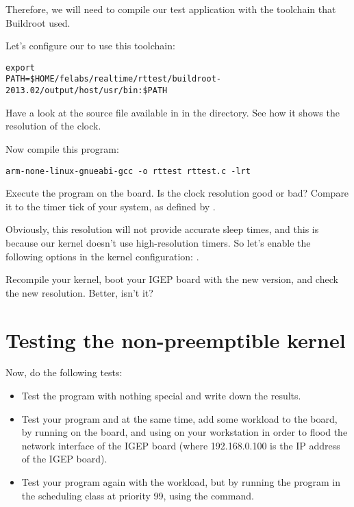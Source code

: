 Therefore, we will need to compile our test application with the
toolchain that Buildroot used.

Let's configure our  to use this toolchain:

\begin{verbatim}
export
PATH=$HOME/felabs/realtime/rttest/buildroot-2013.02/output/host/usr/bin:$PATH
\end{verbatim}

Have a look at the  source file available in  in
the  directory. See how it shows the resolution of the
 clock.

Now compile this program:
\begin{verbatim}
arm-none-linux-gnueabi-gcc -o rttest rttest.c -lrt
\end{verbatim}

Execute the program on the board. Is the clock resolution good or bad?
Compare it to the timer tick of your system, as defined by .

Obviously, this resolution will not provide accurate sleep times, and
this is because our kernel doesn't use high-resolution timers. So
let's enable the following options in the kernel configuration:
.

Recompile your kernel, boot your IGEP board with the new version, and
check the new resolution. Better, isn't it?

\section{Testing the non-preemptible kernel}

Now, do the following tests:
\begin{itemize}
\item Test the program with nothing special and write down the
  results.
\item Test your program and at the same time, add some workload to the
  board, by running  on the
  board, and using  on your
  workstation in order to flood the network interface of the IGEP
  board (where 192.168.0.100 is the IP address of the IGEP board).
\item Test your program again with the workload, but by running the
  program in the  scheduling class at priority 99,
  using the  command.
\end{itemize}

